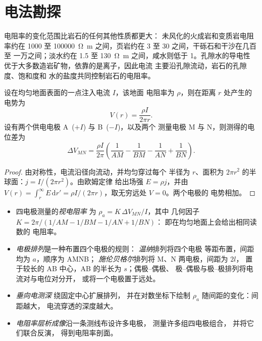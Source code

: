 \section{电法勘探}\label{sec:b3:field-lab-methods-3:electrical}

电阻率的变化范围比岩石的任何其他性质都更大：
未风化的火成岩和变质岩电阻率约在
\num{1000} 至 \qty{100000}{\ohm\metre} 之间，页岩约在
\num{3} 至 \num{30} 之间，干砾石和干沙在几百至
一万之间；淡水约在 \num{1.5} 至
\qty{130}{\ohm\metre} 之间，咸水则低于 1。孔隙水的导电性
优于大多数造岩矿物，依靠的是离子，因此电流
主要沿孔隙流动，岩石的孔隙度、饱和度和
水的盐度共同控制岩石的电阻率。

\begin{theorem}[均匀地面上的点源]\label{thm:b3:field-lab-methods-3:point-source}
设在均匀地面表面的一点注入电流 $I$，该地面
电阻率为 $\rho$，则在距离 $r$ 处产生的电势为
\[
V(r) = \frac{\rho I}{2\pi r} .
\]
设有两个供电电极 A~($+I$) 与 B~($-I$)，以及两个
测量电极 M 与 N，则测得的电位差为
\[
\Delta V_{MN} = \frac{\rho I}{2\pi}\left(\frac{1}{AM} - \frac{1}{BM}
               - \frac{1}{AN} + \frac{1}{BN}\right) .
\]
\end{theorem}

\begin{proof}
由对称性，电流沿径向流动，并均匀穿过每个
半径为 $r$、面积为 $2\pi r^2$ 的半球面：$j = I/(2\pi r^2)$。由欧姆定律
给出场强 $E = \rho j$，并由 $V(r) = \int_r^\infty E\,\mathrm{d}r'
= \rho I/(2\pi r)$，取无穷远处 $V = 0$。两个电极的
电势相加。
\end{proof}

\begin{definition}\label{def:b3:field-lab-methods-3:resistivity}
\leavevmode
\begin{itemize}
  \item 四电极测量的\emph{视电阻率}
        为 $\rho_a = K\,\Delta V_{MN}/I$，其中
        几何因子 $K = 2\pi/(1/AM - 1/BM - 1/AN + 1/BN)$：
        即在均匀地面上会给出相同读数的
        电阻率。
  \item \emph{电极排列}是一种布置四个电极的规则：
        \emph{温纳}排列将四个电极
        等距布置，间距均为 $a$，顺序为 AMNB；
        \emph{施伦贝格尔}排列将 M、N 两电极，间距为 $2l$，
        置于较长的 AB 中心，AB 的半长为 $s$；偶极–偶极、
        极–偶极与极–极排列将电流对与电位对分开，
        或将一个电极置于远处。
  \item \emph{垂向电测深}
        绕固定中心扩展排列，
        并在对数坐标下绘制 $\rho_a$ 随间距的变化：间距越大，
        电流穿透的深度越大。
  \item \emph{电阻率层析成像}沿一条测线布设许多电极，
        测量许多组四电极组合，
        并将它们联合反演，
        得到电阻率剖面。
\end{itemize}
\end{definition}


